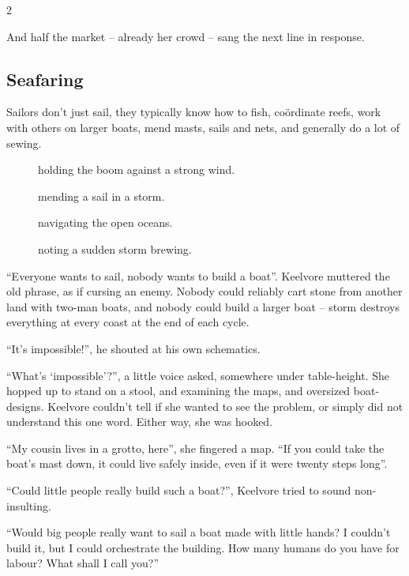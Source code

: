 \begin{multicols}{2}
\begin{exampletext}
  And half the market -- already her crowd -- sang the next line in response.

\end{exampletext}

\subsection{Seafaring}

Sailors don't just sail, they typically know how to fish, co\"ordinate reefs, work with others on larger boats, mend masts, sails and nets, and generally do a lot of sewing.

\begin{description}
  \item[]
    holding the boom against a strong wind.
  \item[]
    mending a sail in a storm.
  \item[]
    navigating the open oceans.
  \item[]
    noting a sudden storm brewing.
\end{description}

\begin{exampletext}
  ``Everyone wants to sail, nobody wants to build a boat''.
  Keelvore muttered the old phrase, as if cursing an enemy.
  Nobody could reliably cart stone from another land with two-man boats, and nobody could build a larger boat -- \gls{storm} destroys everything at every coast at the end of each \gls{cycle}.

  ``It's impossible!'', he shouted at his own schematics.

  ``What's `impossible'?'', a little voice asked, somewhere under table-height.
  She hopped up to stand on a stool, and examining the maps, and oversized boat-designs.
  Keelvore couldn't tell if she wanted to see the problem, or simply did not understand this one word.
  Either way, she was hooked.

  ``My cousin lives in a grotto, here'', she fingered a map.
  ``If you could take the boat's mast down, it could live safely inside, even if it were twenty \glspl{step} long''.

  ``Could little people really build such a boat?'', Keelvore tried to sound non-insulting.

  ``Would big people really want to sail a boat made with little hands?
  I couldn't build it, but I could orchestrate the building.
  How many humans do you have for labour?
  What shall I call you?''


\end{exampletext}
\end{multicols}
